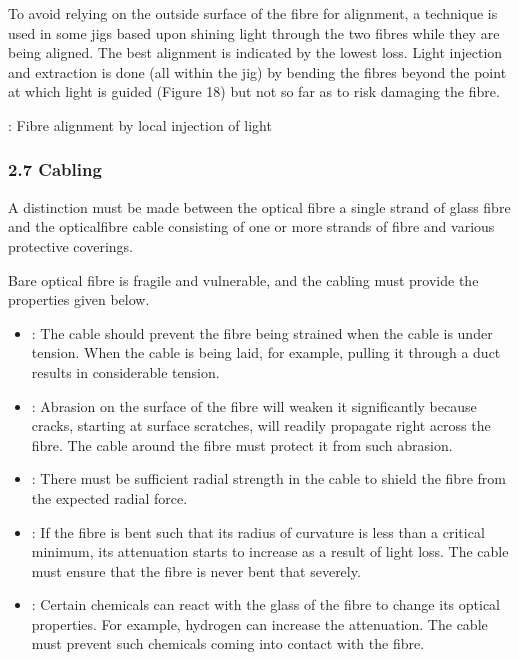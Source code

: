 \documentclass[letterpaper,10pt,english]{sphinxmanual}
\let\sphinxpxdimen\pdfpxdimen\else\newdimen\sphinxpxdimen
\begin{document}
To avoid relying on the outside surface of the fibre for alignment, a technique is used in some jigs based upon shining light through the two fibres while they are being aligned. The best alignment is indicated by the lowest loss. Light injection and extraction is done (all within the jig) by bending the fibres beyond the point at which light is guided (Figure 18) \textendash{} but not so far as to risk damaging the fibre.

\sphinxincludegraphics[width=511\sphinxpxdimen,height=211\sphinxpxdimen]{{t305_018i}.jpg}

: Fibre alignment by local injection of light


\subsubsection{2.7 Cabling}
\label{\detokenize{content/session_00/Part_00_02:2.7-Cabling}}
A distinction must be made between the optical fibre \textendash{} a single strand of glass fibre \textendash{} and the optical\sphinxhyphen{}fibre cable consisting of one or more strands of fibre and various protective coverings.

Bare optical fibre is fragile and vulnerable, and the cabling must provide the properties given below.
\begin{itemize}
\item {} 
: The cable should prevent the fibre being strained when the cable is under tension. When the cable is being laid, for example, pulling it through a duct results in considerable tension.

\item {} 
: Abrasion on the surface of the fibre will weaken it significantly because cracks, starting at surface scratches, will readily propagate right across the fibre. The cable around the fibre must protect it from such abrasion.

\item {} 
: There must be sufficient radial strength in the cable to shield the fibre from the expected radial force.

\item {} 
: If the fibre is bent such that its radius of curvature is less than a critical minimum, its attenuation starts to increase as a result of light loss. The cable must ensure that the fibre is never bent that severely.

\item {} 
: Certain chemicals can react with the glass of the fibre to change its optical properties. For example, hydrogen can increase the attenuation. The cable must prevent such chemicals coming into contact with the fibre.

\end{itemize}
\end{document}
